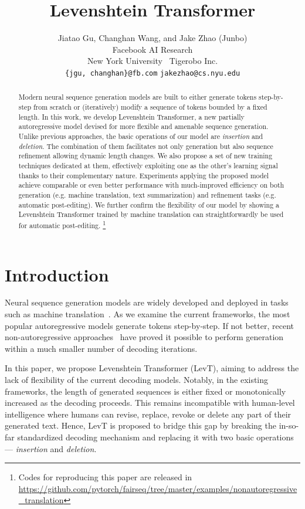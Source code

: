 \documentclass{article}
\title{Levenshtein Transformer}
\author{
Jiatao Gu\fair, 
Changhan Wang\fair,
and
Jake Zhao (Junbo)\nyu\ti\\
\fair Facebook AI Research\\
\nyu New York University \ \ti Tigerobo Inc. \\
\fair\texttt{\{jgu, changhan\}@fb.com} \nyu\texttt{jakezhao@cs.nyu.edu} \\
}
\begin{document}
\maketitle

\begin{abstract}
  Modern neural sequence generation models are built to either generate tokens step-by-step from scratch or (iteratively) modify a sequence of tokens bounded by a fixed length.   In this work, we develop Levenshtein Transformer, a new partially autoregressive model devised for more flexible and amenable sequence generation. Unlike previous approaches, the basic operations of our model are \emph{insertion} and \emph{deletion}.  The combination of them facilitates not only generation but also sequence refinement allowing dynamic length changes.  We also propose a set of new training techniques dedicated at them, effectively exploiting one as the other's learning signal thanks to their complementary nature.  Experiments applying the proposed model achieve  comparable or even better performance with much-improved efficiency on both generation (e.g. machine translation, text summarization) and refinement tasks (e.g. automatic post-editing).  We further confirm the flexibility of our model by showing a Levenshtein Transformer trained by machine translation can straightforwardly be used for automatic post-editing. \footnote{Codes for reproducing this paper are released in \url{https://github.com/pytorch/fairseq/tree/master/examples/nonautoregressive_translation}}
  
  
\end{abstract}

\section{Introduction}
Neural sequence generation models are widely developed and deployed in tasks such as machine translation~\citep{bahdanau2014neural,vaswani2017attention}. As we examine the current frameworks, the most popular autoregressive models generate tokens step-by-step.
If not better, recent non-autoregressive approaches~\citep{gu2017non,kaiser2018fast,lee2018deterministic} have proved it possible to perform generation within a much smaller number of decoding iterations.

In this paper, we propose Levenshtein Transformer (LevT), aiming to address the lack of flexibility of the current decoding models.
Notably, in the existing frameworks, the length of generated sequences is either fixed or monotonically increased as the decoding proceeds.
This remains incompatible with human-level intelligence where humans can revise, replace, revoke or delete any part of their generated text.
Hence, LevT is proposed to bridge this gap by breaking the in-so-far standardized decoding mechanism and replacing it with two basic operations --- \emph{insertion} and \emph{deletion}.
\end{document}
